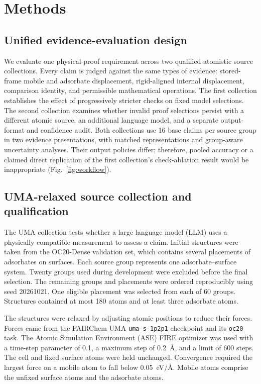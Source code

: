 \section{Methods}
\label{sec:methods}

\subsection{Unified evidence-evaluation design}

We evaluate one physical-proof requirement across two qualified atomistic source collections. Every claim is judged against the same types of evidence: stored-frame mobile and adsorbate displacement, rigid-aligned internal displacement, comparison identity, and permissible mathematical operations. The first collection establishes the effect of progressively stricter checks on fixed model selections. The second collection examines whether invalid proof selections persist with a different atomic source, an additional language model, and a separate output-format and confidence audit. Both collections use 16 base claims per source group in two evidence presentations, with matched representations and group-aware uncertainty analyses. Their output policies differ; therefore, pooled accuracy or a claimed direct replication of the first collection's check-ablation result would be inappropriate (Fig.~\ref{fig:workflow}).

\subsection{UMA-relaxed source collection and qualification}

The UMA collection tests whether a large language model (LLM) uses a physically compatible measurement to assess a claim. Initial structures were taken from the OC20-Dense validation set, which contains several placements of adsorbates on surfaces.\cite{chanussot2021open,lan2023adsorbml} Each source group represents one adsorbate--surface system. Twenty groups used during development were excluded before the final selection. The remaining groups and placements were ordered reproducibly using seed 20261021. One eligible placement was selected from each of 60 groups. Structures contained at most 180 atoms and at least three adsorbate atoms.

The structures were relaxed by adjusting atomic positions to reduce their forces. Forces came from the FAIRChem UMA \texttt{uma-s-1p2p1} checkpoint and its \texttt{oc20} task.\cite{wood2025uma} The Atomic Simulation Environment (ASE) FIRE optimizer was used with a time-step parameter of 0.1, a maximum step of 0.2~\AA, and a limit of 600 steps.\cite{larsen2017atomic} The cell and fixed surface atoms were held unchanged. Convergence required the largest force on a mobile atom to fall below 0.05~eV/\AA. Mobile atoms comprise the unfixed surface atoms and the adsorbate atoms.

